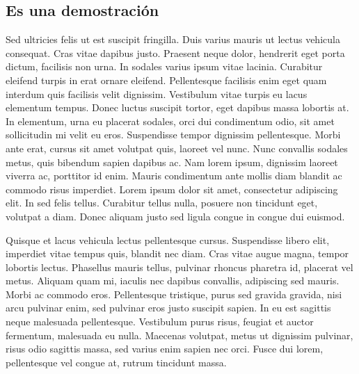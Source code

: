 \documentclass[11pt,a4paper]{report}
\begin{document}
\subsection{Es una demostración}

Sed ultricies felis ut est suscipit fringilla. Duis varius mauris ut lectus vehicula consequat. Cras vitae dapibus justo. Praesent neque dolor, hendrerit eget porta dictum, facilisis non urna. In sodales varius ipsum vitae lacinia. Curabitur eleifend turpis in erat ornare eleifend. Pellentesque facilisis enim eget quam interdum quis facilisis velit dignissim. Vestibulum vitae turpis eu lacus elementum tempus. Donec luctus suscipit tortor, eget dapibus massa lobortis at. In elementum, urna eu placerat sodales, orci dui condimentum odio, sit amet sollicitudin mi velit eu eros. Suspendisse tempor dignissim pellentesque. Morbi ante erat, cursus sit amet volutpat quis, laoreet vel nunc. Nunc convallis sodales metus, quis bibendum sapien dapibus ac. Nam lorem ipsum, dignissim laoreet viverra ac, porttitor id enim. Mauris condimentum ante mollis diam blandit ac commodo risus imperdiet. Lorem ipsum dolor sit amet, consectetur adipiscing elit. In sed felis tellus. Curabitur tellus nulla, posuere non tincidunt eget, volutpat a diam. Donec aliquam justo sed ligula congue in congue dui euismod.

Quisque et lacus vehicula lectus pellentesque cursus. Suspendisse libero elit, imperdiet vitae tempus quis, blandit nec diam. Cras vitae augue magna, tempor lobortis lectus. Phasellus mauris tellus, pulvinar rhoncus pharetra id, placerat vel metus. Aliquam quam mi, iaculis nec dapibus convallis, adipiscing sed mauris. Morbi ac commodo eros. Pellentesque tristique, purus sed gravida gravida, nisi arcu pulvinar enim, sed pulvinar eros justo suscipit sapien. In eu est sagittis neque malesuada pellentesque. Vestibulum purus risus, feugiat et auctor fermentum, malesuada eu nulla. Maecenas volutpat, metus ut dignissim pulvinar, risus odio sagittis massa, sed varius enim sapien nec orci. Fusce dui lorem, pellentesque vel congue at, rutrum tincidunt massa.
\end{document}
